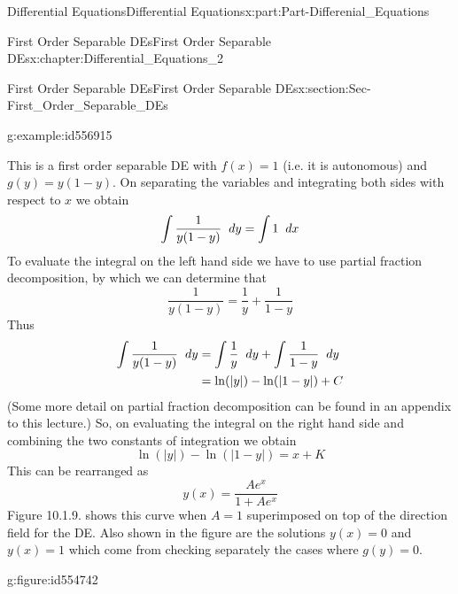 \documentclass[oneside,10pt,]{book}
\numberwithin{equation}{section}
\newcommand{\amp}{&}
\begin{document}
\begin{partptx}{Differential Equations}{}{Differential Equations}{}{}{x:part:Part-Differenial_Equations}
\begin{chapterptx}{First Order Separable DEs}{}{First Order Separable DEs}{}{}{x:chapter:Differential_Equations_2}
\begin{sectionptx}{First Order Separable DEs}{}{First Order Separable DEs}{}{}{x:section:Sec-First_Order_Separable_DEs}
\begin{example}{}{g:example:id556915}
\par\smallskip%
\noindent\hypertarget{g:solution:id554707}{}This is a first order separable DE with \(f(x)=1\) (i.e. it is autonomous) and \(g(y)=y(1-y)\). On separating the variables and integrating both sides with respect to \(x\) we obtain%
\begin{equation*}
\int \frac{1}{y(1-y)}\hspace{2mm}dy=\int 1\hspace{2mm}dx
\end{equation*}
To evaluate the integral on the left hand side we have to use partial fraction decomposition, by which we can determine that%
\begin{equation*}
\frac{1}{y(1-y)}=\frac{1}{y}+\frac{1}{1-y}
\end{equation*}
Thus %
\begin{align*}
\int \frac{1}{y(1-y)}\hspace{2mm}dy \amp=\int \frac{1}{y}\hspace{2mm}dy +\int \frac{1}{1-y}\hspace{2mm}dy\\
\amp =\ln(\vert y\vert)-\ln(\vert 1-y\vert)+C
\end{align*}
%
 (Some more detail on partial fraction decomposition can be found in an appendix to this lecture.) So, on evaluating the integral on the right hand side and combining the two constants of integration we obtain%
\begin{equation*}
\ln(\vert y\vert)-\ln(\vert 1-y\vert)=x+K
\end{equation*}
This can be rearranged as%
\begin{equation*}
y(x)=\frac{Ae^x}{1+Ae^x}
\end{equation*}
Figure 10.1.9. shows this curve when \(A=1\) superimposed on top of the direction field for the DE. Also shown in the figure are the solutions \(y(x)=0\) and \(y(x)=1\) which come from checking separately the cases where \(g(y)=0\). \begin{figureptx}{}{g:figure:id554742}{}%
\begin{image}{0.125}{0.75}{0.125}%

\end{image}
\end{figureptx}
\end{example}
\end{sectionptx}
\end{chapterptx}
\end{partptx}
\end{document}
